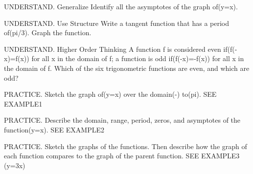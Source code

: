 \documentclass{article}
\newenvironment{practice}[2]{}{}        %
\newcommand{\answer}[1]{}               %
\newcommand{\placeholder}[2]{}          %
\newcommand{\te}[1]{}                   %
\begin{document}
\begin{practice}{12}{2}
UNDERSTAND. Generalize Identify all the asymptotes of the graph of(y=\sec x).
\answer{all the odd multiples (positive and negative) of(pi/2)}
\end{practice}
\begin{practice}{13}{2}
UNDERSTAND. Use Structure Write a tangent function that has a period of(pi/3). Graph the function.
\answer{(y=\tan3x); graph shown.}
\placeholder{graph}{Red tan3x on arrowed x,y axes,O;xgridpi/4 labels-pi,-pi/2,pi/2,pi;ygrid1 labels-4,-2,2,4;window-5pi/4..5pi/4,-5..5. Seven rising branches zeros integerpi/3 and asymptotes pi/6+kpi/3,not drawn;end arrows.}
\end{practice}
\begin{practice}{14}{3}
UNDERSTAND. Higher Order Thinking A function f is considered even if(f(-x)=f(x)) for all x in the domain of f; a function is odd if(f(-x)=-f(x)) for all x in the domain of f. Which of the six trigonometric functions are even, and which are odd?
\answer{Cosine and secant are even; all the others are odd.}
\end{practice}
\begin{practice}{15}{2}
PRACTICE. Sketch the graph of(y=\tan x) over the domain(-\pi) to(pi). SEE EXAMPLE1
\answer{Graph shown.}
\placeholder{graph}{Red tan x,arrowed x,y axes,O;xgridpi/4 labels-pi,-pi/2,pi/2,pi;ygrid1 labels-4,-2,2,4;window-5pi/4..5pi/4,-5..5. Three rising branches zeros-pi,0,pi,asymptotes+-pi/2 implied,end arrows.}
\end{practice}
\begin{practice}{16}{2}
PRACTICE. Describe the domain, range, period, zeros, and asymptotes of the function(y=\tan x). SEE EXAMPLE2
\answer{domain:(\{x:x\neq\frac\pi2+n\pi,\text{ where n is an integer}\}); range:(-\infty,\infty); period:(\pi); zeros:(\{x:x=n\pi,\text{ where n is an integer}\}); asymptotes:(y=\frac\pi2+n\pi), where n is an integer}
\te{Printed y for vertical asymptotes; likely x.}
\end{practice}
\begin{practice}{17}{2}
PRACTICE. Sketch the graphs of the functions. Then describe how the graph of each function compares to the graph of the parent function. SEE EXAMPLE3
(y=\tan3x)
\answer{There is a vertical compression that makes the graph look more bent than the parent function(y=\tan x). The horizontal compression changes the period of the function from(pi) (for y=tan x) to(pi/3).}
\placeholder{graph}{Red(1/2)tan3x,arrowed x,y axes,O; xgridpi/4 labeled-pi,-pi/2,pi/2,pi;ygrid1 labels-4,-2,2,4;window-5pi/4..5pi/4,-5..5. Seven steep rising branches with zeros kpi/3 and asymptotes pi/6+kpi/3,notdrawn;curveend arrows.}
\end{practice}
\end{document}
